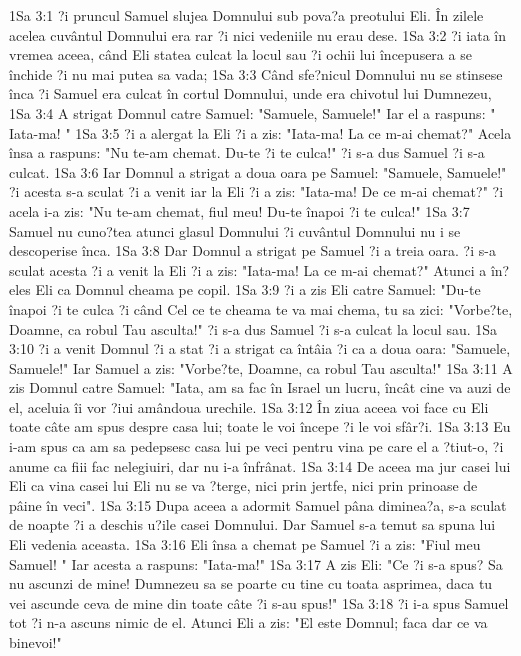 1Sa 3:1  ?i pruncul Samuel slujea Domnului sub pova?a preotului Eli. În zilele acelea cuvântul Domnului era rar ?i nici vedeniile nu erau dese.
1Sa 3:2  ?i iata în vremea aceea, când Eli statea culcat la locul sau ?i ochii lui începusera a se închide ?i nu mai putea sa vada;
1Sa 3:3  Când sfe?nicul Domnului nu se stinsese înca ?i Samuel era culcat în cortul Domnului, unde era chivotul lui Dumnezeu,
1Sa 3:4  A strigat Domnul catre Samuel: "Samuele, Samuele!" Iar el a raspuns: " Iata-ma! "
1Sa 3:5  ?i a alergat la Eli ?i a zis: "Iata-ma! La ce m-ai chemat?" Acela însa a raspuns: "Nu te-am chemat. Du-te ?i te culca!" ?i s-a dus Samuel ?i s-a culcat.
1Sa 3:6  Iar Domnul a strigat a doua oara pe Samuel: "Samuele, Samuele!" ?i acesta s-a sculat ?i a venit iar la Eli ?i a zis: "Iata-ma! De ce m-ai chemat?" ?i acela i-a zis: "Nu te-am chemat, fiul meu! Du-te înapoi ?i te culca!"
1Sa 3:7  Samuel nu cuno?tea atunci glasul Domnului ?i cuvântul Domnului nu i se descoperise înca.
1Sa 3:8  Dar Domnul a strigat pe Samuel ?i a treia oara. ?i s-a sculat acesta ?i a venit la Eli ?i a zis: "Iata-ma! La ce m-ai chemat?" Atunci a în?eles Eli ca Domnul cheama pe copil.
1Sa 3:9  ?i a zis Eli catre Samuel: "Du-te înapoi ?i te culca ?i când Cel ce te cheama te va mai chema, tu sa zici: "Vorbe?te, Doamne, ca robul Tau asculta!" ?i s-a dus Samuel ?i s-a culcat la locul sau.
1Sa 3:10  ?i a venit Domnul ?i a stat ?i a strigat ca întâia ?i ca a doua oara: "Samuele, Samuele!" Iar Samuel a zis: "Vorbe?te, Doamne, ca robul Tau asculta!"
1Sa 3:11  A zis Domnul catre Samuel: "Iata, am sa fac în Israel un lucru, încât cine va auzi de el, aceluia îi vor ?iui amândoua urechile.
1Sa 3:12  În ziua aceea voi face cu Eli toate câte am spus despre casa lui; toate le voi începe ?i le voi sfâr?i.
1Sa 3:13  Eu i-am spus ca am sa pedepsesc casa lui pe veci pentru vina pe care el a ?tiut-o, ?i anume ca fiii fac nelegiuiri, dar nu i-a înfrânat.
1Sa 3:14  De aceea ma jur casei lui Eli ca vina casei lui Eli nu se va ?terge, nici prin jertfe, nici prin prinoase de pâine în veci".
1Sa 3:15  Dupa aceea a adormit Samuel pâna diminea?a, s-a sculat de noapte ?i a deschis u?ile casei Domnului. Dar Samuel s-a temut sa spuna lui Eli vedenia aceasta.
1Sa 3:16  Eli însa a chemat pe Samuel ?i a zis: "Fiul meu Samuel! " Iar acesta a raspuns: "Iata-ma!"
1Sa 3:17  A zis Eli: "Ce ?i s-a spus? Sa nu ascunzi de mine! Dumnezeu sa se poarte cu tine cu toata asprimea, daca tu vei ascunde ceva de mine din toate câte ?i s-au spus!"
1Sa 3:18  ?i i-a spus Samuel tot ?i n-a ascuns nimic de el. Atunci Eli a zis: "El este Domnul; faca dar ce va binevoi!"
